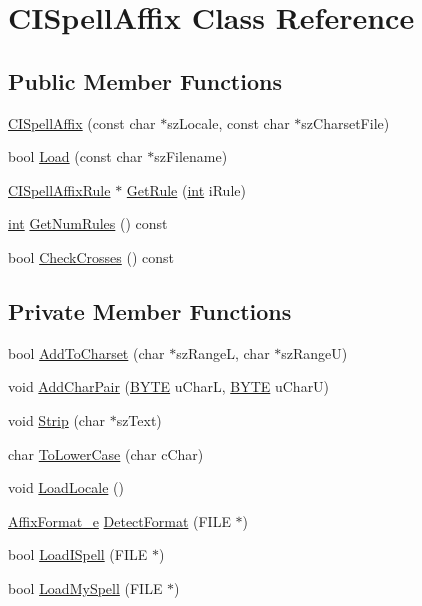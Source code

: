 \hypertarget{classCISpellAffix}{\section{C\-I\-Spell\-Affix Class Reference}
\label{classCISpellAffix}
}
\subsection*{Public Member Functions}
\begin{DoxyCompactItemize}
\item 
\hyperlink{classCISpellAffix_a6effbd7e8cfe3668051b21d84e0d6def}{C\-I\-Spell\-Affix} (const char $\ast$sz\-Locale, const char $\ast$sz\-Charset\-File)
\item 
bool \hyperlink{classCISpellAffix_aa72d79a4cd553420948a8f4eded33405}{Load} (const char $\ast$sz\-Filename)
\item 
\hyperlink{classCISpellAffixRule}{C\-I\-Spell\-Affix\-Rule} $\ast$ \hyperlink{classCISpellAffix_ab83ed4737f1c00386c523a42742074e3}{Get\-Rule} (\hyperlink{sphinxexpr_8cpp_a4a26e8f9cb8b736e0c4cbf4d16de985e}{int} i\-Rule)
\item 
\hyperlink{sphinxexpr_8cpp_a4a26e8f9cb8b736e0c4cbf4d16de985e}{int} \hyperlink{classCISpellAffix_a180bdfbbbaff3cbccdc424fbfd8a98bf}{Get\-Num\-Rules} () const 
\item 
bool \hyperlink{classCISpellAffix_a544c1f07aafbe175e44e58f0c870546d}{Check\-Crosses} () const 
\end{DoxyCompactItemize}
\subsection*{Private Member Functions}
\begin{DoxyCompactItemize}
\item 
bool \hyperlink{classCISpellAffix_a968dcce2145a2b8311b00aaad9337db1}{Add\-To\-Charset} (char $\ast$sz\-Range\-L, char $\ast$sz\-Range\-U)
\item 
void \hyperlink{classCISpellAffix_ad525c5c7989e9999031d00d9c616b1b1}{Add\-Char\-Pair} (\hyperlink{sphinxstd_8h_a4ae1dab0fb4b072a66584546209e7d58}{B\-Y\-T\-E} u\-Char\-L, \hyperlink{sphinxstd_8h_a4ae1dab0fb4b072a66584546209e7d58}{B\-Y\-T\-E} u\-Char\-U)
\item 
void \hyperlink{classCISpellAffix_a1fa34411e6ea8e862acacf4f18780fa8}{Strip} (char $\ast$sz\-Text)
\item 
char \hyperlink{classCISpellAffix_a3a3da97598c5d9d959867a3f60b6c3b2}{To\-Lower\-Case} (char c\-Char)
\item 
void \hyperlink{classCISpellAffix_abe51a780a9490172c2e7f490069ccae9}{Load\-Locale} ()
\item 
\hyperlink{spelldump_8cpp_a074110dc5a5bc2df6c6c74743f41adfa}{Affix\-Format\-\_\-e} \hyperlink{classCISpellAffix_ada5cbb45ede47881fc19e374c5aff788}{Detect\-Format} (F\-I\-L\-E $\ast$)
\item 
bool \hyperlink{classCISpellAffix_a44f9a3ac4a0c0f9a09cfbb58817ed35f}{Load\-I\-Spell} (F\-I\-L\-E $\ast$)
\item 
bool \hyperlink{classCISpellAffix_a71c85cbbd776a2007dd1af9b3b476a11}{Load\-My\-Spell} (F\-I\-L\-E $\ast$)
\end{DoxyCompactItemize}
